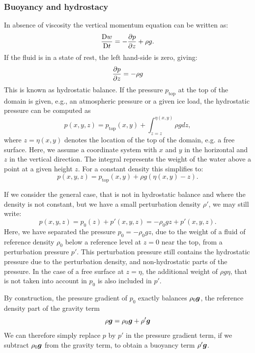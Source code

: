 \subsubsection{Buoyancy and hydrostacy}\label{sec:buoyancy_hydrostacy}
In absence of viscosity the vertical momentum equation can be written as:
\begin{equation}\label{eq:vertmom}
\DDt[t]{w} = -\ppx[z]{p} + \rho g.
\end{equation}
If the fluid is in a state of rest, the left hand-side is zero, giving:
\begin{equation}\label{eq:hydrostatic_balance}
\ppx[z]{p} = -\rho g
\end{equation}
This is known as hydrostatic balance. If the pressure $p_{\text{top}}$ at the top of the domain
is given, e.g., an atmospheric pressure or a given ice load, 
the hydrostatic pressure can be computed as
\begin{equation} \label{eq:hydrostatic_pressure}
  p(x,y,z) = p_{\text{top}}(x,y) + \int_{z=z}^{\eta(x,y)} \rho g dz,
\end{equation}
where $z=\eta(x,y)$ denotes the location of the top of the domain, e.g. a free
surface. Here, we assume a coordinate system with $x$ and $y$ in the horizontal
and $z$ in the vertical direction. The integral represents the weight of the
water above a point at a given height $z$. For a constant density this simplifies to:
\begin{equation}
  p(x,y,z) = p_{\text{top}}(x,y) + \rho g \left(\eta(x,y)-z\right).
\end{equation}

If we consider the general case, that is not in hydrostatic balance and where
the density is not constant, but we have a small perturbation density 
$\rho'$, we may still write:
\begin{equation}
  p(x,y,z) = p_0(z) + p'(x,y,z) = -\rho_0 g z + p'(x,y,z).
\end{equation}
Here, we have separated the pressure $p_0=-\rho_0 g z$, due to the weight of a fluid of reference density $\rho_0$ below a reference level at $z=0$ near the top, from a perturbation pressure $p'$. This
perturbation pressure still contains the hydrostatic pressure due to the
perturbation density, and non-hydrostatic parts of the pressure. In the 
case of a free surface at $z=\eta$, the additional weight of $\rho g\eta$, that
is not taken into account in $p_0$ is also included in $p'$.

By construction, the pressure gradient of $p_0$ exactly balances $\rho_0\bmg$,
the reference density part of the gravity term
\begin{equation}
  \rho\bmg=\rho_0\bmg+\rho'\bmg
\end{equation}
We can therefore simply replace $p$ by $p'$ in the pressure gradient term, if we
subtract $\rho_0\bmg$ from the gravity term, to obtain a buoyancy term
$\rho'\bmg$.

